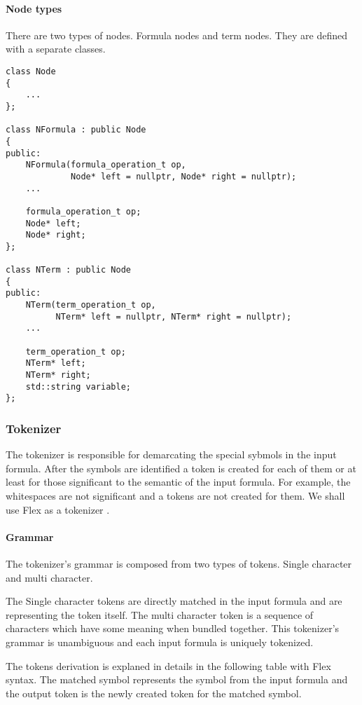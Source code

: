 \documentclass{article}
\begin{document}
	\newpage
	\paragraph{Node types} There are two types of nodes. Formula nodes and term nodes. They are defined with a separate classes.

	\begin{lstlisting}
class Node
{
    ...
};

class NFormula : public Node
{
public:
    NFormula(formula_operation_t op,
             Node* left = nullptr, Node* right = nullptr);
    ...

    formula_operation_t op;
    Node* left;
    Node* right;
};

class NTerm : public Node
{
public:
    NTerm(term_operation_t op,
          NTerm* left = nullptr, NTerm* right = nullptr);
    ...

    term_operation_t op;
    NTerm* left;
    NTerm* right;
    std::string variable;
};
	\end{lstlisting}

	\subsubsection{Tokenizer}
	The tokenizer is responsible for demarcating the special sybmols in the input formula.
	After the symbols are identified a token is created for each of them or at least for those significant to the semantic of the input formula.
	For example, the whitespaces are not significant and a tokens are not created for them.
	We shall use Flex as a tokenizer \cite{flex-tokenizer}.

	\paragraph{Grammar} The tokenizer's grammar is composed from two types of tokens. Single character and multi character.

	The Single character tokens are directly matched in the input formula and are representing the token itself.
	The multi character token is a sequence of characters which have some meaning when bundled together.
	This tokenizer's grammar is unambiguous and each input formula is uniquely tokenized.

	The tokens derivation is explaned in details in the following table with Flex syntax. The matched symbol represents the symbol from the input formula and the output token is the newly created token for the matched symbol.
\end{document}
